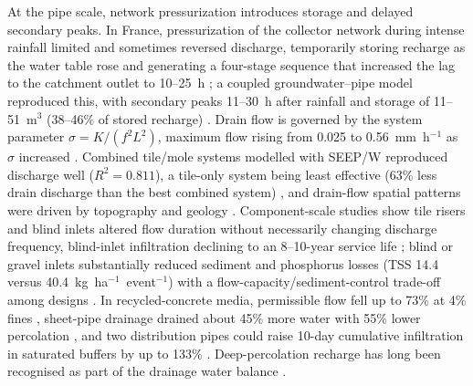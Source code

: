 At the pipe scale, network pressurization introduces storage and delayed secondary peaks. In France, pressurization of the collector network during intense rainfall limited and sometimes reversed discharge, temporarily storing recharge as the water table rose and generating a four-stage sequence that increased the lag to the catchment outlet to 10--25~h \parencite{Henine2010}; a coupled groundwater--pipe model reproduced this, with secondary peaks 11--30~h after rainfall and storage of 11--51~m$^3$ (38--46\% of stored recharge) \parencite{Henine2014}. Drain flow is governed by the system parameter $\sigma=K/(f^2L^2)$, maximum flow rising from 0.025 to 0.56~mm~h$^{-1}$ as $\sigma$ increased \parencite{Bouarfa2000}. Combined tile/mole systems modelled with SEEP/W reproduced discharge well ($R^2=0.811$), a tile-only system being least effective (63\% less drain discharge than the best combined system) \parencite{Tuohy2018}, and drain-flow spatial patterns were driven by topography and geology \parencite{Mahmood2023}. Component-scale studies show tile risers and blind inlets altered flow duration without necessarily changing discharge frequency, blind-inlet infiltration declining to an 8--10-year service life \parencite{Williams2020,Williams2019}; blind or gravel inlets substantially reduced sediment and phosphorus losses (TSS 14.4 versus 40.4~kg~ha$^{-1}$~event$^{-1}$) with a flow-capacity/sediment-control trade-off among designs \parencite{Feyereisen2015b,Li2017b}. In recycled-concrete media, permissible flow fell up to 73\% at 4\% fines \parencite{McCulloch2017}, sheet-pipe drainage drained about 45\% more water with 55\% lower percolation \parencite{Tamura2021,Arif2021}, and two distribution pipes could raise 10-day cumulative infiltration in saturated buffers by up to 133\% \parencite{Jaynes2019b}. Deep-percolation recharge has long been recognised as part of the drainage water balance \parencite{BOOKMAN1959}.

